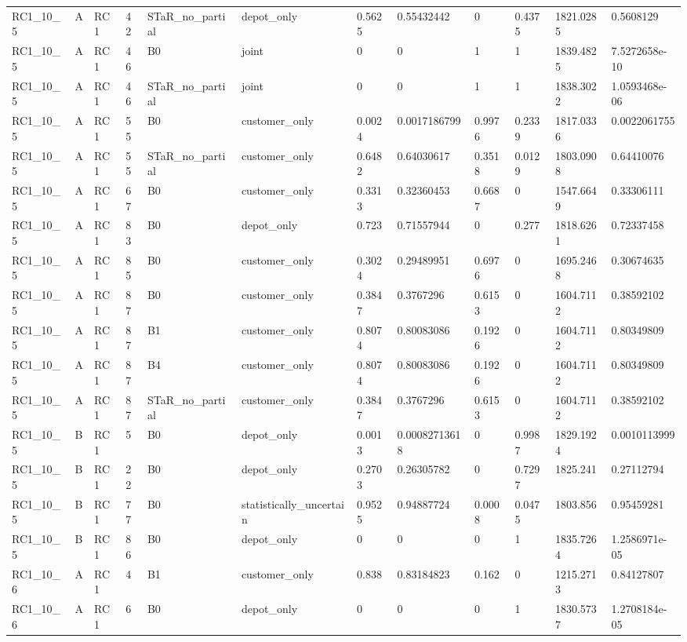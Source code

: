 \begin{longtable}{llllllllllll}
RC1\_10\_5 & A & RC1 & 42 & STaR\_no\_partial & depot\_only & 0.5625 & 0.55432442 & 0 & 0.4375 & 1821.0285 & 0.5608129 \\
RC1\_10\_5 & A & RC1 & 46 & B0 & joint & 0 & 0 & 1 & 1 & 1839.4825 & 7.5272658e-10 \\
RC1\_10\_5 & A & RC1 & 46 & STaR\_no\_partial & joint & 0 & 0 & 1 & 1 & 1838.3022 & 1.0593468e-06 \\
RC1\_10\_5 & A & RC1 & 55 & B0 & customer\_only & 0.0024 & 0.0017186799 & 0.9976 & 0.2339 & 1817.0336 & 0.0022061755 \\
RC1\_10\_5 & A & RC1 & 55 & STaR\_no\_partial & customer\_only & 0.6482 & 0.64030617 & 0.3518 & 0.0129 & 1803.0908 & 0.64410076 \\
RC1\_10\_5 & A & RC1 & 67 & B0 & customer\_only & 0.3313 & 0.32360453 & 0.6687 & 0 & 1547.6649 & 0.33306111 \\
RC1\_10\_5 & A & RC1 & 83 & B0 & depot\_only & 0.723 & 0.71557944 & 0 & 0.277 & 1818.6261 & 0.72337458 \\
RC1\_10\_5 & A & RC1 & 85 & B0 & customer\_only & 0.3024 & 0.29489951 & 0.6976 & 0 & 1695.2468 & 0.30674635 \\
RC1\_10\_5 & A & RC1 & 87 & B0 & customer\_only & 0.3847 & 0.3767296 & 0.6153 & 0 & 1604.7112 & 0.38592102 \\
RC1\_10\_5 & A & RC1 & 87 & B1 & customer\_only & 0.8074 & 0.80083086 & 0.1926 & 0 & 1604.7112 & 0.80349809 \\
RC1\_10\_5 & A & RC1 & 87 & B4 & customer\_only & 0.8074 & 0.80083086 & 0.1926 & 0 & 1604.7112 & 0.80349809 \\
RC1\_10\_5 & A & RC1 & 87 & STaR\_no\_partial & customer\_only & 0.3847 & 0.3767296 & 0.6153 & 0 & 1604.7112 & 0.38592102 \\
RC1\_10\_5 & B & RC1 & 5 & B0 & depot\_only & 0.0013 & 0.00082713618 & 0 & 0.9987 & 1829.1924 & 0.0010113999 \\
RC1\_10\_5 & B & RC1 & 22 & B0 & depot\_only & 0.2703 & 0.26305782 & 0 & 0.7297 & 1825.241 & 0.27112794 \\
RC1\_10\_5 & B & RC1 & 77 & B0 & statistically\_uncertain & 0.9525 & 0.94887724 & 0.0008 & 0.0475 & 1803.856 & 0.95459281 \\
RC1\_10\_5 & B & RC1 & 86 & B0 & depot\_only & 0 & 0 & 0 & 1 & 1835.7264 & 1.2586971e-05 \\
RC1\_10\_6 & A & RC1 & 4 & B1 & customer\_only & 0.838 & 0.83184823 & 0.162 & 0 & 1215.2713 & 0.84127807 \\
RC1\_10\_6 & A & RC1 & 6 & B0 & depot\_only & 0 & 0 & 0 & 1 & 1830.5737 & 1.2708184e-05 \\

\end{longtable}
